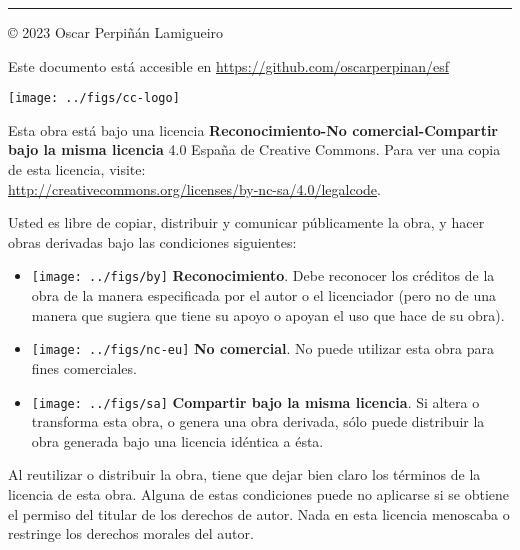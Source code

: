 
\chapterprecis{\vfill{}
}
\rule[.5ex]{\linewidth}{1pt} 

© 2023 Oscar Perpiñán Lamigueiro

Este documento está accesible en \url{https://github.com/oscarperpinan/esf}

\begin{center}
\texttt{[image: ../figs/cc-logo]}
\par\end{center}

Esta obra está bajo una licencia \textbf{Reconocimiento-No comercial-Compartir
bajo la misma licencia} 4.0 España de Creative Commons. Para ver una
copia de esta licencia, visite:\\
 \url{http://creativecommons.org/licenses/by-nc-sa/4.0/legalcode}.

Usted es libre de copiar, distribuir y comunicar públicamente la obra,
y hacer obras derivadas bajo las condiciones siguientes:
\begin{itemize}
\item \texttt{[image: ../figs/by]} \textbf{Reconocimiento}.
Debe reconocer los créditos de la obra de la manera especificada por
el autor o el licenciador (pero no de una manera que sugiera que tiene
su apoyo o apoyan el uso que hace de su obra). 
\item \texttt{[image: ../figs/nc-eu]} \textbf{No comercial}.
No puede utilizar esta obra para fines comerciales. 
\item \texttt{[image: ../figs/sa]} \textbf{Compartir bajo la
misma licencia}. Si altera o transforma esta obra, o genera una obra
derivada, sólo puede distribuir la obra generada bajo una licencia
idéntica a ésta. 
\end{itemize}
Al reutilizar o distribuir la obra, tiene que dejar bien claro los
términos de la licencia de esta obra. Alguna de estas condiciones
puede no aplicarse si se obtiene el permiso del titular de los derechos
de autor. Nada en esta licencia menoscaba o restringe los derechos
morales del autor.

